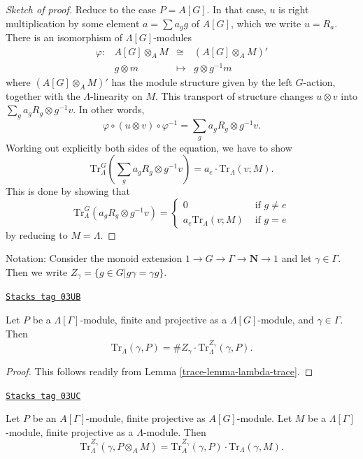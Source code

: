 \begin{proof}[Sketch of proof]
Reduce to the case $P=A[G]$. In that case, $u$ is right multiplication by some
element $a = \sum a_gg$ of $A[G]$, which we write $u = R_a$. There is an
isomorphism of $\Lambda[G]$-modules
$$
\begin{matrix}
\varphi : & A[G]\otimes_A M & \cong & \left(A[G]\otimes_A M\right)'\\
& g \otimes m & \longmapsto & g \otimes g^{-1}m
\end{matrix}
$$
where $\left(A[G]\otimes_A M\right)'$ has the module structure given by the
left $G$-action, together with the $\Lambda$-linearity on $M$. This transport
of structure changes $u \otimes v$ into $\sum_ga_gR_g \otimes g^{-1}v$. In other
words,
$$
\varphi \circ (u \otimes v) \circ \varphi^{-1}
=
\sum_ga_gR_g \otimes g^{-1}v.
$$
Working out explicitly both sides of the equation, we have to show
$$
\text{Tr}_\Lambda^G\left(\sum_g a_gR_g \otimes g^{-1}v\right) = a_e\cdot
\text{Tr}_\Lambda(v; M).
$$
This is done by showing that
$$
\text{Tr}_\Lambda^G\left(a_gR_g \otimes g^{-1}v\right) =
\left\{
\begin{matrix}
0 & \text{ if } g\neq e\\
a_e\text{Tr}_\Lambda\left(v; M\right) & \text{ if }g = e
\end{matrix}
\right.
$$
by reducing to $M=\Lambda$.
\end{proof}

Notation:
Consider the monoid extension $1 \to G\to \Gamma\to \mathbf{N} \to 1$ and let
$\gamma\in \Gamma$.
Then we write $Z_\gamma = \{g\in G | g\gamma = \gamma g\}$.

\begin{lemma}
\label{trace-lemma-gamma-z-gamma-trace}
\href{https://stacks.math.columbia.edu/tag/03UB}{\texttt{Stacks tag 03UB}}

Let $P$ be a $\Lambda[\Gamma]$-module, finite and projective as a
$\Lambda[G]$-module, and $\gamma \in \Gamma$. Then
$$
\text{Tr}_{\Lambda}(\gamma, P) =
\# Z_\gamma \cdot \text{Tr}_\Lambda^{Z_\gamma}\left(\gamma, P\right).
$$
\end{lemma}

\begin{proof}

This follows readily from Lemma \ref{trace-lemma-lambda-trace}.
\end{proof}

\begin{lemma}
\label{trace-lemma-weak-trace}
\href{https://stacks.math.columbia.edu/tag/03UC}{\texttt{Stacks tag 03UC}}

Let $P$ be an $A[\Gamma]$-module, finite projective as $A[G]$-module. Let $M$
be a $\Lambda[\Gamma]$-module, finite projective as a $\Lambda$-module. Then
$$
\text{Tr}_{\Lambda}^{Z_\gamma}(\gamma, P \otimes_A M) =
\text{Tr}_A^{Z_\gamma}(\gamma, P)\cdot \text{Tr}_\Lambda(\gamma, M).
$$
\end{lemma}

